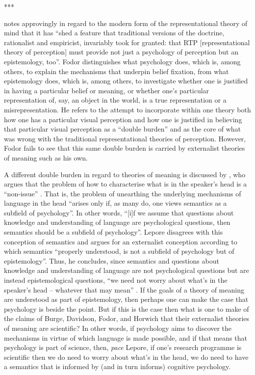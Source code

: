 \begin{center}
***
\end{center}

\citet[21]{Fodor2000a} notes approvingly in regard to the modern form of the representational theory of mind that it has “shed a feature that traditional versions of the doctrine, rationalist and empiricist, invariably took for granted: that RTP [representational theory of perception] must provide not just a psychology of perception but an epistemology, too”. Fodor distinguishes what psychology does, which is, among others, to explain the mechanisms that underpin belief fixation, from what epistemology does, which is, among others, to investigate whether one is justified in having a particular belief or meaning, or whether one’s particular representation of, say, an object in the world, is a true representation or a misrepresentation. He refers to the attempt to incorporate within one theory both how one has a particular visual perception and how one is justified in believing that particular visual perception as a “double burden” and as the core of what was wrong with the traditional representational theories of perception. However, Fodor fails to see that this same double burden is carried by externalist theories of meaning such as his own.
	
A different double burden in regard to theories of meaning is discussed by \citet{Lepore1983,Lepore1983a}, who argues that the problem of how to characterise what is in the speaker’s head is a “non-issue” \citep[185, fn. 5]{Lepore1983}. That is, the problem of unearthing the underlying mechanisms of language in the head “arises only if, as many do, one views semantics as a subfield of psychology”. In other words, “[i]f we assume that questions about knowledge and understanding of language are psychological questions, then semantics should be a subfield of psychology”. Lepore disagrees with this conception of semantics and argues for an externalist conception according to which semantics “properly understood, is not a subfield of psychology but of epistemology”. Thus, he concludes, since semantics and questions about knowledge and understanding of language are not psychological questions but are instead epistemological questions, “we need not worry about what’s in the speaker’s head – whatever that may mean” \citep[185, fn. 5]{Lepore1983}. If the goals of a theory of meaning are understood as part of epistemology, then perhaps one can make the case that psychology is beside the point. But if this is the case then what is one to make of the claims of Burge, Davidson, Fodor, and Horwich that their externalist theories of meaning are scientific? In other words, if psychology aims to discover the mechanisms in virtue of which language is made possible, and if that means that psychology is part of science, then, \textit{pace} Lepore, if one’s research programme is scientific then we do need to worry about what’s in the head, we do need to have a semantics that is informed by (and in turn informs) cognitive psychology.

